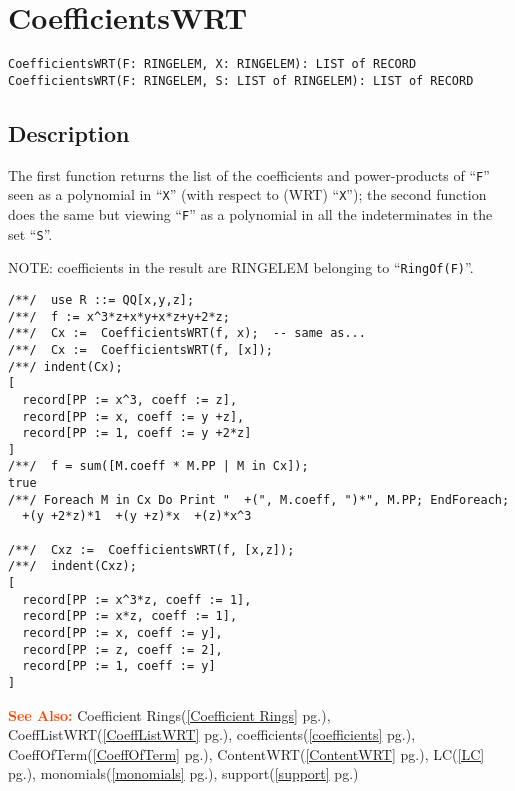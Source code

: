 \documentclass[a4paper]{mybook}
\newenvironment{command}{}{} %
\newcommand\SeeAlso{\par\textcolor{OrangeRed}{\textbf{\large See Also: }}}
\begin{document}
\section{CoefficientsWRT}
\label{CoefficientsWRT}
\begin{command} %


\begin{Verbatim}[label=syntax, rulecolor=\color{MidnightBlue},
frame=single]
CoefficientsWRT(F: RINGELEM, X: RINGELEM): LIST of RECORD
CoefficientsWRT(F: RINGELEM, S: LIST of RINGELEM): LIST of RECORD
\end{Verbatim}


\subsection*{Description}

The first function returns the list of the coefficients and power-products
of ``\verb&F&'' seen as a polynomial in ``\verb&X&'' (with respect to (WRT) ``\verb&X&'');
the second function does the same but viewing ``\verb&F&''
as a polynomial in all the indeterminates in the set ``\verb&S&''.

NOTE: coefficients in the result are RINGELEM belonging to ``\verb&RingOf(F)&''.
\begin{Verbatim}[label=example, rulecolor=\color{PineGreen}, frame=single]
/**/  use R ::= QQ[x,y,z];
/**/  f := x^3*z+x*y+x*z+y+2*z;
/**/  Cx :=  CoefficientsWRT(f, x);  -- same as...
/**/  Cx :=  CoefficientsWRT(f, [x]);
/**/ indent(Cx);
[
  record[PP := x^3, coeff := z],
  record[PP := x, coeff := y +z],
  record[PP := 1, coeff := y +2*z]
]
/**/  f = sum([M.coeff * M.PP | M in Cx]);
true
/**/ Foreach M in Cx Do Print "  +(", M.coeff, ")*", M.PP; EndForeach;
  +(y +2*z)*1  +(y +z)*x  +(z)*x^3

/**/  Cxz :=  CoefficientsWRT(f, [x,z]);
/**/  indent(Cxz);
[
  record[PP := x^3*z, coeff := 1],
  record[PP := x*z, coeff := 1],
  record[PP := x, coeff := y],
  record[PP := z, coeff := 2],
  record[PP := 1, coeff := y]
]
\end{Verbatim}


\SeeAlso %
  Coefficient Rings(\ref{Coefficient Rings} pg.\pageref{Coefficient Rings}), 
    CoeffListWRT(\ref{CoeffListWRT} pg.\pageref{CoeffListWRT}), 
    coefficients(\ref{coefficients} pg.\pageref{coefficients}), 
    CoeffOfTerm(\ref{CoeffOfTerm} pg.\pageref{CoeffOfTerm}), 
    ContentWRT(\ref{ContentWRT} pg.\pageref{ContentWRT}), 
    LC(\ref{LC} pg.\pageref{LC}), 
    monomials(\ref{monomials} pg.\pageref{monomials}), 
    support(\ref{support} pg.\pageref{support})
\end{command} %
\end{document}
